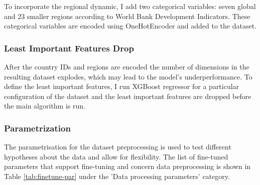 \documentclass[runningheads]{llncs}
\begin{document}
    To incorporate the regional dynamic, I add two categorical variables: seven global and 23 smaller regions according to World Bank Development Indicators. These categorical variables are encoded using OneHotEncoder and added to the dataset.


    \subsubsection{Least Important Features Drop}
    After the country IDs and regions are encoded the number of dimensions in the resulting dataset explodes, which may lead to the model's underperformance. To define the least important features, I run XGBoost regressor for a particular configuration of the dataset and the least important features are dropped before the main algorithm is run.


    \subsubsection{Parametrization}
    The parametrisation for the dataset preprocessing is used to test different hypotheses about the data and allow for flexibility. The list of fine-tuned parameters that support fine-tuning and concern data preprocessing is shown in Table \ref{tab:finetune-par} under the 'Data processing parameters' category.




%
\end{document}
